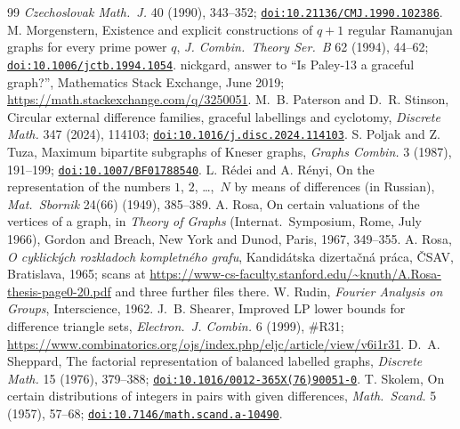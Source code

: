 \documentclass[11pt]{amsart}
\theoremstyle{tplain}
\theoremstyle{tdefinition}
\theoremstyle{tremark}
\newcommand{\doi}[1]{\href{https://doi.org/#1}{\nolinkurl{doi:#1}}}
\begin{document}
\begin{thebibliography}{99}
\emph{Czechoslovak Math.\ J.} 40 (1990), 343--352; \doi{10.21136/CMJ.1990.102386}.
M. Morgenstern, Existence and explicit constructions of $q+1$ regular
Ramanujan graphs for every prime power $q$, \emph{J. Combin.\ Theory Ser.~B}
62 (1994), 44--62; \doi{10.1006/jctb.1994.1054}.
nickgard, answer to ``Is Paley-13 a graceful graph?'', Mathematics Stack
Exchange, June 2019; \url{https://math.stackexchange.com/q/3250051}.
M.~B. Paterson and D.~R. Stinson, Circular external difference families,
graceful labellings and cyclotomy, \emph{Discrete Math.} 347 (2024), 114103; \doi{10.1016/j.disc.2024.114103}.
S. Poljak and Z. Tuza, Maximum bipartite subgraphs of Kneser graphs,
\emph{Graphs Combin.} 3 (1987), 191--199; \doi{10.1007/BF01788540}.
L. R\'edei and A. R\'enyi, On the representation of the numbers
$1$, $2$, \dots,~$N$ by means of differences (in Russian),
\emph{Mat.\ Sbornik} 24(66) (1949), 385--389.
A. Rosa, On certain valuations of the vertices of a graph, in
\emph{Theory of Graphs} (Internat.\ Symposium, Rome, July 1966),
Gordon and Breach, New York and Dunod, Paris, 1967, 349--355.
A. Rosa, \emph{O cyklick\'ych rozkladoch kompletn\'eho grafu}, Kandid\'atska
dizerta\v{c}n\'a pr\'aca, \v{C}SAV, Bratislava, 1965; scans at
\url{https://www-cs-faculty.stanford.edu/~knuth/A.Rosa-thesis-page0-20.pdf}
and three further files there.
W. Rudin, \emph{Fourier Analysis on Groups}, Interscience, 1962.
J.~B. Shearer, Improved LP lower bounds for difference triangle sets,
\emph{Electron.\ J. Combin.} 6 (1999), \#R31; \url{https://www.combinatorics.org/ojs/index.php/eljc/article/view/v6i1r31}.
D.~A. Sheppard, The factorial representation of balanced labelled graphs,
\emph{Discrete Math.} 15 (1976), 379--388; \doi{10.1016/0012-365X(76)90051-0}.
T. Skolem, On certain distributions of integers in pairs with given
differences, \emph{Math.\ Scand.} 5 (1957), 57--68; \doi{10.7146/math.scand.a-10490}.
\end{thebibliography}
\end{document}
